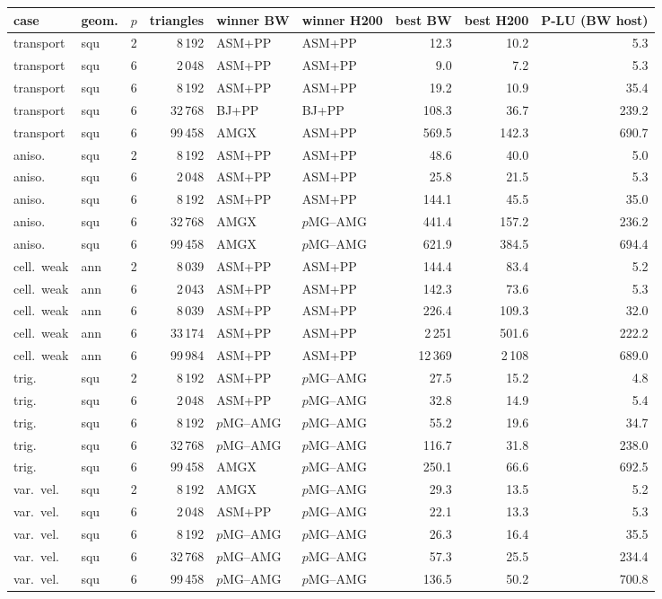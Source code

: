 \begin{tabular}{llrrllrrr}
\toprule
case & geom. & $p$ & triangles & winner BW & winner H200 & best BW & best H200 & P-LU (BW host)\\
\midrule
transport & squ & 2 & 8\,192 & ASM+PP & ASM+PP & 12.3 & 10.2 & 5.3\\
transport & squ & 6 & 2\,048 & ASM+PP & ASM+PP & 9.0 & 7.2 & 5.3\\
transport & squ & 6 & 8\,192 & ASM+PP & ASM+PP & 19.2 & 10.9 & 35.4\\
transport & squ & 6 & 32\,768 & BJ+PP & BJ+PP & 108.3 & 36.7 & 239.2\\
transport & squ & 6 & 99\,458 & AMGX & ASM+PP & 569.5 & 142.3 & 690.7\\
aniso. & squ & 2 & 8\,192 & ASM+PP & ASM+PP & 48.6 & 40.0 & 5.0\\
aniso. & squ & 6 & 2\,048 & ASM+PP & ASM+PP & 25.8 & 21.5 & 5.3\\
aniso. & squ & 6 & 8\,192 & ASM+PP & ASM+PP & 144.1 & 45.5 & 35.0\\
aniso. & squ & 6 & 32\,768 & AMGX & $p$MG--AMG & 441.4 & 157.2 & 236.2\\
aniso. & squ & 6 & 99\,458 & AMGX & $p$MG--AMG & 621.9 & 384.5 & 694.4\\
cell.\ weak & ann & 2 & 8\,039 & ASM+PP & ASM+PP & 144.4 & 83.4 & 5.2\\
cell.\ weak & ann & 6 & 2\,043 & ASM+PP & ASM+PP & 142.3 & 73.6 & 5.3\\
cell.\ weak & ann & 6 & 8\,039 & ASM+PP & ASM+PP & 226.4 & 109.3 & 32.0\\
cell.\ weak & ann & 6 & 33\,174 & ASM+PP & ASM+PP & 2\,251 & 501.6 & 222.2\\
cell.\ weak & ann & 6 & 99\,984 & ASM+PP & ASM+PP & 12\,369 & 2\,108 & 689.0\\
trig. & squ & 2 & 8\,192 & ASM+PP & $p$MG--AMG & 27.5 & 15.2 & 4.8\\
trig. & squ & 6 & 2\,048 & ASM+PP & $p$MG--AMG & 32.8 & 14.9 & 5.4\\
trig. & squ & 6 & 8\,192 & $p$MG--AMG & $p$MG--AMG & 55.2 & 19.6 & 34.7\\
trig. & squ & 6 & 32\,768 & $p$MG--AMG & $p$MG--AMG & 116.7 & 31.8 & 238.0\\
trig. & squ & 6 & 99\,458 & AMGX & $p$MG--AMG & 250.1 & 66.6 & 692.5\\
var.\ vel. & squ & 2 & 8\,192 & AMGX & $p$MG--AMG & 29.3 & 13.5 & 5.2\\
var.\ vel. & squ & 6 & 2\,048 & ASM+PP & $p$MG--AMG & 22.1 & 13.3 & 5.3\\
var.\ vel. & squ & 6 & 8\,192 & $p$MG--AMG & $p$MG--AMG & 26.3 & 16.4 & 35.5\\
var.\ vel. & squ & 6 & 32\,768 & $p$MG--AMG & $p$MG--AMG & 57.3 & 25.5 & 234.4\\
var.\ vel. & squ & 6 & 99\,458 & $p$MG--AMG & $p$MG--AMG & 136.5 & 50.2 & 700.8\\
\bottomrule
\end{tabular}
